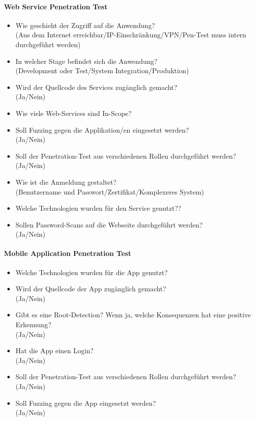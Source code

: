 \paragraph{Web Service Penetration Test}
\begin{itemize}
	\item Wie geschieht der Zugriff auf die Anwendung?\\
	(Aus dem Internet erreichbar/IP-Einschränkung/VPN/Pen-Test muss intern durchgeführt werden)
	\item In welcher Stage befindet sich die Anwendung?\\
	(Development oder Test/System Integration/Produktion)
	\item Wird der Quellcode des Services zugänglich gemacht? \\
	(Ja/Nein)
	\item Wie viele Web-Services sind In-Scope?
	\item Soll Fuzzing gegen die Applikation/en eingesetzt werden?\\
	(Ja/Nein)
	\item Soll der Penetration-Test aus verschiedenen Rollen durchgeführt werden?\\
	(Ja/Nein)
	\item  Wie ist die Anmeldung gestaltet?\\
	(Benutzername und Passwort/Zertifikat/Komplexeres System)
	\item Welche Technologien wurden für den Service genutzt??
	\item Sollen Password-Scans auf die Webseite durchgeführt werden?\\
	(Ja/Nein)
\end{itemize}

\paragraph{Mobile Application Penetration Test}
\begin{itemize}
	\item Welche Technologien wurden für die App genutzt?
	\item Wird der Quellcode der App zugänglich gemacht?\\
	(Ja/Nein)
	\item Gibt es eine Root-Detection? Wenn ja, welche Konsequenzen hat eine positive Erkennung?\\
	(Ja/Nein)
	\item Hat die App einen Login?\\
	(Ja/Nein)
	\item Soll der Penetration-Test aus verschiedenen Rollen durchgeführt werden?\\
	(Ja/Nein)
	\item Soll Fuzzing gegen die App eingesetzt werden?\\
	(Ja/Nein)
\end{itemize}

